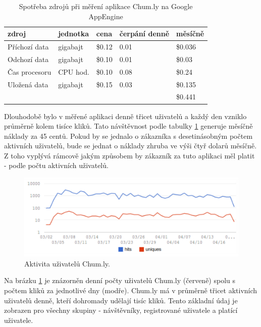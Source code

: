 \documentclass[bc,male,java,dept456]{diploma}						%
\begin{document}
\bigskip


\begin{table}
	\centering
	
\begin{tabular}{p{3.25cm} p{2.5cm} p{2cm} p{2.5cm} p{2cm}}
zdroj					& jednotka & cena		& čerpání denně	& měsíčně \\
\hline
Příchozí data			& gigabajt				& \$0.12	& 0.01			& \$0.036 	\\
Odchozí data			& gigabajt				& \$0.10	& 0.01			& \$0.03	\\
Čas procesoru			& CPU hod.				& \$0.10	& 0.08 			& \$0.24	\\
Uložená data			& gigabajt				& \$0.15	& 0.03			& \$0.135	\\
\hline
						& 		 				& 			& 				& \$0.441 \\
\end{tabular}
	
	\caption{Spotřeba zdrojů při měření aplikace Chum.ly na Google AppEngine}	
	\label{tab:consumption}
\end{table}


Dlouhodobě bylo v měřené aplikaci denně třicet uživatelů a každý den vzniklo prů\-měr\-ně kolem tisíce kliků. Tato návštěvnost podle tabulky \ref{tab:consumption} generuje měsíčně náklady za 45 centů. Pokud by se jednalo o zákazníka s desetinásobným počtem aktivních uživatelů, bude se jednat o náklady zhruba ve výši čtyř dolarů měsíčně. Z toho vyplývá rámcově jakým způsobem by zákazník za tuto aplikaci měl platit - podle počtu aktivních uživatelů.

\begin{figure}[h]
	\centering
	\includegraphics[width=13.45cm]{img/ud_active_users.pdf}
	\caption{Aktivita uživatelů Chum.ly.}
	\label{img:chumly_active_users}
\end{figure}


Na brázku \ref{img:chumly_active_users} je znázorněn denní počty uživatelů Chum.ly (červeně) spolu s počtem kliků za jednotlivé dny (modře). Chum.ly má v průměrně třicet aktivních uživatelů denně, kteří dohromady udělají tisíc kliků. Tento základní údaj je zobrazen pro všechny skupiny - návštěvníky, registrované uživatele a platící uživatele.  
\end{document}
